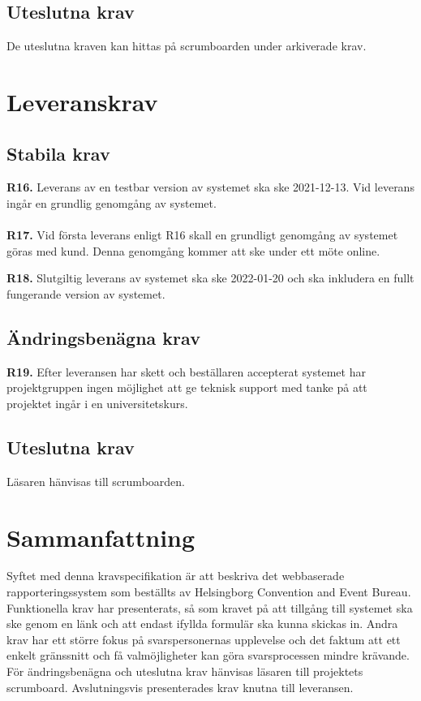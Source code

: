 \documentclass{article}
\begin{document}
    \vspace{1em}    
    \subsection{Uteslutna krav}
    De uteslutna kraven kan hittas på scrumboarden under arkiverade krav.
    \newpage
    \section{Leveranskrav}
    
    \subsection{Stabila krav}
\noindent \large{\textbf{R16.}}
     \normalsize{Leverans av en testbar version av systemet ska ske 2021-12-13. Vid leverans ingår en grundlig genomgång av systemet.
     }\\\\
\noindent \large{\textbf{R17.}}
     \normalsize{Vid första leverans enligt R16 skall en grundligt genomgång av systemet göras med kund. Denna genomgång kommer att ske under ett möte online.}
     
     \vspace{1em}
     
\noindent \large{\textbf{R18.}}
    \normalsize{Slutgiltig leverans av systemet ska ske 2022-01-20 och ska inkludera en fullt fungerande version av systemet.}
    
     
    \subsection{Ändringsbenägna krav}
    
    \noindent \large{\textbf{R19.}}
    \normalsize{Efter leveransen har skett och beställaren accepterat systemet har projektgruppen ingen möjlighet att ge teknisk support med tanke på att projektet ingår i en universitetskurs.}
    
    \subsection{Uteslutna krav}
    Läsaren hänvisas till scrumboarden.
    

\section{Sammanfattning}
Syftet med denna kravspecifikation är att beskriva det webbaserade rapporteringssystem som beställts av Helsingborg Convention and Event Bureau. Funktionella krav har presenterats, så som kravet på att tillgång till systemet ska ske genom en länk och att endast ifyllda formulär ska kunna skickas in. Andra krav har ett större fokus på svarspersonernas upplevelse och det faktum att ett enkelt gränssnitt och få valmöjligheter kan göra svarsprocessen mindre krävande. För ändringsbenägna och uteslutna krav hänvisas läsaren till projektets scrumboard. Avslutningsvis presenterades krav knutna till leveransen. 
    
    
   

\end{document}
